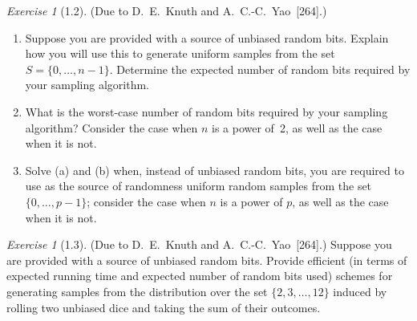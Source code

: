 \documentclass[twoside,12pt]{book}
\theoremstyle{plain}
\theoremstyle{definition}
\theoremstyle{remark}
\newtheorem{exercise}[theorem]{Exercise}
\begin{document}
\begin{exercise}[1.2]
(Due to D.~E.~Knuth and A.~C.-C.~Yao~[264].)
\begin{enumerate}[label=(\alph*)]
\item Suppose you are provided with a source of unbiased random bits.  Explain
  how you will use this to generate uniform samples from the set
  $S=\{0,\ldots,n-1\}$.  Determine the expected number of random bits
  required by your sampling algorithm.
\item What is the worst-case number of random bits required by your sampling
  algorithm?  Consider the case when $n$ is a power of~2, as well as the case
  when it is not.
\item Solve (a) and (b) when, instead of unbiased random bits, you are
  required to use as the source of randomness uniform random samples from the
  set $\{0,\ldots,p-1\}$; consider the case when $n$ is a power of $p$, as
  well as the case when it is not.
\end{enumerate}
\end{exercise}

\begin{exercise}[1.3]
(Due to D.~E.~Knuth and A.~C.-C.~Yao~[264].) Suppose you are provided with
a source of unbiased random bits.  Provide efficient (in terms of expected
running time and expected number of random bits used) schemes for generating
samples from the distribution over the set $\{2,3,\ldots,12\}$ induced by
rolling two unbiased dice and taking the sum of their outcomes.
\end{exercise}
\end{document}
